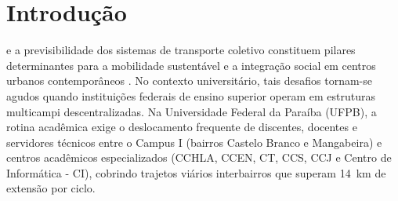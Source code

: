 \documentclass[lettersize,journal]{IEEEtran}
\begin{document}
\section{Introdução}
 e a previsibilidade dos sistemas de transporte coletivo constituem pilares determinantes para a mobilidade sustentável e a integração social em centros urbanos contemporâneos \cite{ref_its_smart}. No contexto universitário, tais desafios tornam-se agudos quando instituições federais de ensino superior operam em estruturas multicampi descentralizadas. Na Universidade Federal da Paraíba (UFPB), a rotina acadêmica exige o deslocamento frequente de discentes, docentes e servidores técnicos entre o Campus I (bairros Castelo Branco e Mangabeira) e centros acadêmicos especializados (CCHLA, CCEN, CT, CCS, CCJ e Centro de Informática - CI), cobrindo trajetos viários interbairros que superam 14~km de extensão por ciclo.
\end{document}
